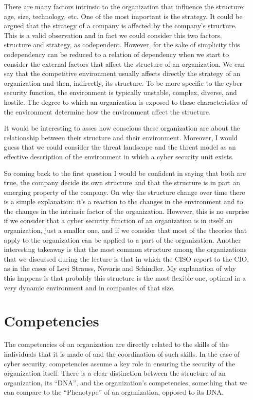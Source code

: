 \documentclass[a4paper, 10pt, conference]{ieeeconf}      %
\begin{document}
There are many factors intrinsic to the organization that influence the structure: age, size, technology, etc. One of the most important is the strategy. It could be argued that the strategy of a company is affected by the company’s structure. This is a valid observation and in fact we could consider this two factors, structure and strategy, as codependent. However, for the sake of simplicity this codependency can be reduced to a relation of dependency when we start to consider the external factors that affect the structure of an organization. We can say that the competitive environment usually affects directly the strategy of an organization and then, indirectly, its structure. To be more specific to the cyber security function, the environment is typically unstable, complex, diverse, and hostile. The degree to which an organization is exposed to these characteristics of the environment determine how the environment affect the structure. \cite{mintzberg1989}

It would be interesting to asses how conscious these organization are about the relationship between their structure and their environment. Moreover, I would guess that we could consider the threat landscape and the threat model as an effective description of the environment in which a cyber security unit exists.

So coming back to the first question I would be confident in saying that both are true, the company decide its own structure and that the structure is in part an emerging property of the company. On why the structure change over time there is a simple explanation: it’s a reaction to the changes in the environment and to the changes in the intrinsic factor of the organization. However, this is no surprise if we consider that a cyber security function of an organization is in itself an organization, just a smaller one, and if we consider that most of the theories that apply to the organization can be applied to a part of the organization. Another interesting takeaway is that the most common structure among the organizations that we discussed during the lecture is that in which the CISO report to the CIO, as in the cases of Levi Strauss, Novaris and Schindler. My explanation of why this happens is that probably this structure is the most flexible one, optimal in a very dynamic environment and in companies of that size. 

\section{Competencies}
The competencies of an organization are directly related to the skills of the individuals that it is made of and the coordination of such skills. In the case of cyber security, competencies assume a key role in ensuring the security of the organization itself. There is a clear distinction between the structure of an organization, its “DNA”, and the organization’s competencies, something that we can compare to the “Phenotype” of an organization, opposed to its DNA. 
\end{document}
